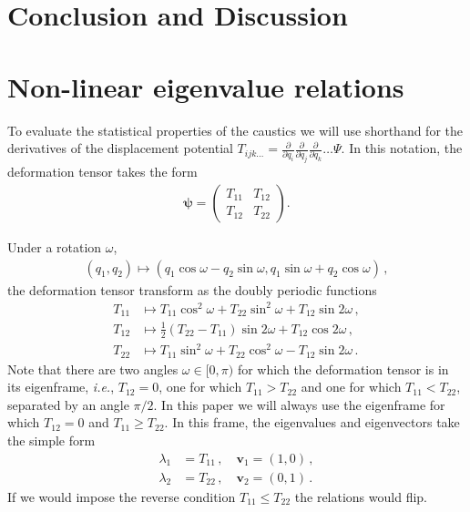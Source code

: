 \documentclass[a4paper, 11pt]{article}
\begin{document}
\section{Conclusion and Discussion}



\newpage
\appendix

\section{Non-linear eigenvalue relations}\label{ap:eigenvalueRel}
To evaluate the statistical properties of the caustics we will use shorthand for the derivatives of the displacement potential $T_{ijk\dots} = \frac{\partial}{\partial q_i}\frac{\partial}{\partial q_j}\frac{\partial}{\partial q_k}\dots \Psi$. In this notation, the deformation tensor takes the form
\begin{align}
\bm{\psi} = \begin{pmatrix} T_{11} & T_{12} \\ T_{12} & T_{22}\end{pmatrix}.
\end{align}

Under a rotation $\omega$, 
\begin{align}
(q_1,q_2) \mapsto  (q_1\cos \omega - q_2 \sin \omega, q_1 \sin \omega + q_2 \cos \omega)\,,
\end{align}
the deformation tensor transform as the doubly periodic functions
\begin{align}
T_{11} &\mapsto T_{11} \cos ^2 \omega  + T_{22} \sin^2 \omega  + T_{12}\sin 2\omega\,,\\
T_{12} &\mapsto \frac{1}{2}(T_{22}-T_{11})\sin 2 \omega + T_{12} \cos 2\omega\,,\\
T_{22} &\mapsto T_{11} \sin ^2 \omega  + T_{22} \cos^2 \omega  - T_{12} \sin 2\omega\,.
\end{align}
Note that there are two angles $\omega \in [0,\pi)$ for which the deformation tensor is in its eigenframe, \textit{i.e.}, $T_{12}=0$, one for which $T_{11}>T_{22}$ and one for which $T_{11}<T_{22}$, separated by an angle $\pi/2$. In this paper we will always use the eigenframe for which $T_{12}=0$ and $T_{11} \geq T_{22}$. In this frame, the eigenvalues and eigenvectors take the simple form 
\begin{align}
\lambda_{1} &= T_{11}\,,\quad \bm{v}_1=(1,0)\,,\\
\lambda_{2} &= T_{22}\,,\quad \bm{v}_2=(0,1)\,.
\end{align}
If we would impose the reverse condition $T_{11} \leq T_{22}$ the relations would flip.
\end{document}
